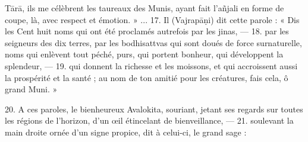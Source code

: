 \documentclass[a4paper, 11pt, oneside, french, landscape, twocolumn]{article}
\begin{document}
T\={a}r\={a}, ils me célèbrent les taureaux des Munis, ayant fait l'a\~{n}jali en forme de coupe, là, avec respect et émotion. » ... 17. Il (Vajrap\={a}\d{n}i) dit cette parole : « Dis les Cent huit noms qui ont été proclamés autrefois par les jinas, --- 18. par les seigneurs des dix terres, par les bodhisattvas qui sont doués de force surnaturelle, noms qui enlèvent tout péché, purs, qui portent bonheur, qui développent la splendeur, --- 19. qui donnent la richesse et les moissons, et qui accroissent aussi la prospérité et la santé ; au nom de ton amitié pour les créatures, fais cela, ô grand Muni. »

20. A ces paroles, le bienheureux Avalokita, souriant, jetant ses regards sur toutes les régions de l'horizon, d'un œil étincelant de bienveillance, --- 21. soulevant la main droite ornée d'un signe propice, dit à celui-ci, le grand sage :
\end{document}
